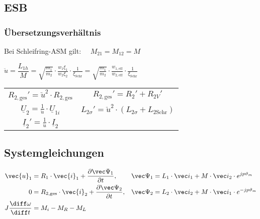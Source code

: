 \begin{sectionbox}
\subsection{ESB}
\begin{center}

\end{center}

\subsubsection{Übersetzungsverhältnis}
Bei Schleifring-ASM gilt: $\quad M_{21} = M_{12} = M$

\begin{symbolbox}
\begin{center}
$\ddot{u} = \dfrac{L_{1h}}{M} = \sqrt{\frac{m_1}{m_2}}\cdot\frac{w_1\xi_1}{w_2\xi_2}\cdot\frac{1}{\xi_\text{Schr}} = \sqrt{\frac{m_1}{m_2}}\cdot\frac{w_{1,\text{eff}}}{w_{2,\text{eff}}}\cdot\frac{1}{\xi_\text{Schr}}$
\end{center}
\end{symbolbox}
\begin{tabularx}{\columnwidth}{CC}
$R_{2,\text{ges}}' = \ddot{u}^2\cdot R_{2,\text{ges}}$ & $R_{2,\text{ges}}' = R_2' + R_{2V}'$\\
$\underline U_2 = \frac{1}{\ddot{u}}\cdot\underline U_{1i}$ &  $L_{2\sigma}' = \ddot{u}^2\cdot (L_{2\sigma} + L_{2\text{Schr}})$\\
$\underline{I}_2' = \frac{1}{\ddot{u}}\cdot\underline{I}_2$ &
\end{tabularx}

\subsection{Systemgleichungen}
\begin{align*}
\vec{u}_1 &= R_1\cdot\vec{i}_1 + \frac{\partial\vec\Psi_1}{\partial t}, & \vec\Psi_1 &= L_1\cdot\vec i_1 + M\cdot\vec i_2\cdot e^{jp\vartheta_m}\\
0 &= R_{2,\text{ges}}\cdot\vec{i}_2 + \frac{\partial\vec\Psi_2}{\partial t}, & \vec\Psi_2 &= L_2\cdot\vec i_2 + M\cdot\vec i_1\cdot e^{-jp\vartheta_m}\\
J\frac{\diff\omega}{\diff t} &= M_i - M_R - M_L
\end{align*}
\end{sectionbox}

